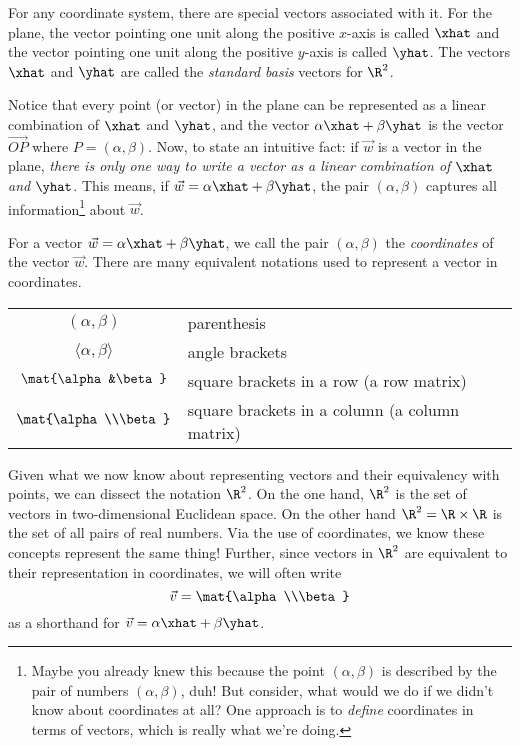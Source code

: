 For any coordinate system, there are special vectors
associated with it.  For the plane, the vector pointing one unit along
the positive $x$-axis is called $\xhat$ and the vector pointing one unit along
the positive $y$-axis is called $\yhat$.  The vectors $\xhat$ and $\yhat$ are
called the \emph{standard basis} vectors for $\R^2$.

Notice that every point (or vector) in the plane can be represented
as a linear combination of $\xhat$ and $\yhat$, and the vector
$\alpha\xhat+\beta\yhat$ is the vector $\overrightarrow{OP}$ where
$P=(\alpha,\beta)$.  Now, to state an intuitive fact:  if $\vec w$ is
a vector in the plane, \emph{there is
only one way to write a vector as a linear combination of
$\xhat$ and $\yhat$}.  This means, if $\vec w=\alpha\xhat+\beta\yhat$,
the pair $(\alpha,\beta)$ captures all information\footnote{
	Maybe you already knew this because the point $(\alpha,\beta)$
	is described by the pair of numbers $(\alpha,\beta)$, duh!
	But consider, what would we do if we didn't know about coordinates
	at all? One approach is to \emph{define} coordinates in terms
	of vectors, which is really what we're doing.
} about $\vec w$.


For a vector $\vec w=\alpha\xhat+\beta\yhat$,
we call the pair $(\alpha,\beta)$  the
\emph{coordinates} of the vector $\vec w$.  There
are many equivalent notations used to represent a vector in coordinates.
\begin{center}
	\begin{tabular}{c p{5cm}}
		$(\alpha,\beta)$ & parenthesis\\
		$\langle \alpha,\beta\rangle$ & angle brackets\\
		$\mat{\alpha&\beta}$ & square brackets in a row (a row matrix)\\
		$\mat{\alpha\\\beta}$ & square brackets in a column (a column matrix)\\
	\end{tabular}
\end{center}

Given what we now know about representing vectors and their equivalency
with points, we can dissect the notation $\R^2$.
On the one hand, $\R^2$ is the set of vectors in two-dimensional Euclidean
space.  On the other hand $\R^2=\R\times \R$ is the set of all pairs of real
numbers.  Via the use of coordinates, we know these concepts represent the
same thing!
Further,
since vectors in $\R^2$ are equivalent to their representation in coordinates,
we will often write
\[
	\vec v=\mat{\alpha\\\beta}
\]
as a shorthand for $\vec v=\alpha\xhat+\beta\yhat$.


